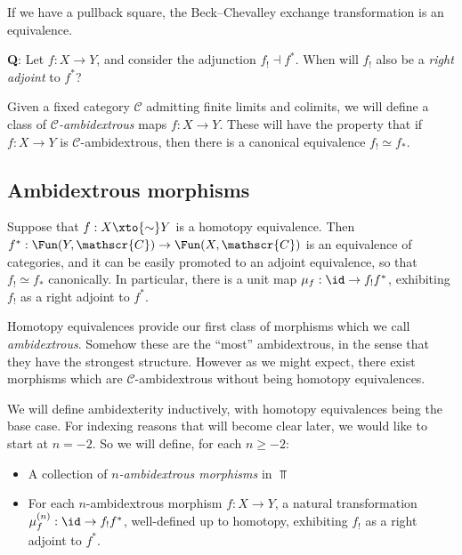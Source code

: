 \begin{proposition} If we have a pullback square, the Beck--Chevalley exchange transformation is an equivalence.
\end{proposition}

\textbf{Q}: Let $f: X \to Y$, and consider the adjunction $f_! \dashv f^\ast$. When will $f_!$ also be a \textit{right adjoint} to $f^\ast$?

Given a fixed category $\mathscr{C}$ admitting finite limits and colimits, we will define a class of $\mathscr{C}$\textit{-ambidextrous} maps $f: X \to Y$. These will have the property that if $f: X \to Y$ is $\mathscr{C}$-ambidextrous, then there is a canonical equivalence $f_! \simeq f_\ast$.


\subsection{Ambidextrous morphisms}

\begin{example} Suppose that $f: X \xto{\sim} Y$ is a homotopy equivalence. Then $f^\ast: \Fun(Y, \mathscr{C}) \to \Fun(X, \mathscr{C})$ is an equivalence of categories, and it can be easily promoted to an adjoint equivalence, so that $f_! \simeq f_\ast$ canonically. In particular, there is a unit map $\mu_f : \id \to f_! f^\ast$, exhibiting $f_!$ as a right adjoint to $f^\ast$.
\end{example}

Homotopy equivalences provide our first class of morphisms which we call \textit{ambidextrous}. Somehow these are the ``most'' ambidextrous, in the sense that they have the strongest structure. However as we might expect, there exist morphisms which are $\mathscr{C}$-ambidextrous without being homotopy equivalences.

We will define ambidexterity inductively, with homotopy equivalences being the base case. For indexing reasons that will become clear later, we would like to start at $n=-2$. So we will define, for each $n \ge -2$:
\begin{itemize}
    \item A collection of $n$\textit{-ambidextrous morphisms} in $\Top$
    \item For each $n$-ambidextrous morphism $f: X \to Y$, a natural transformation $\mu_f^{(n)}: \id \to f_! f^\ast$, well-defined up to homotopy, exhibiting $f_!$ as a right adjoint to $f^\ast$.
\end{itemize}

